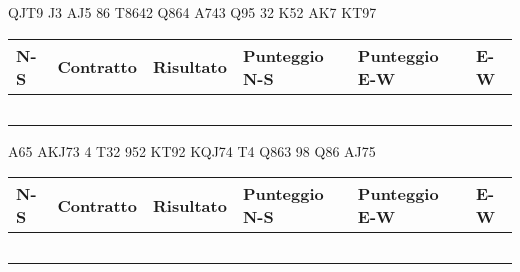 \documentclass[a4paper,italian,12pt]{article}
\begin{document}
\medskip

\begin{tcolorbox}
\begin{minipage}{.3\textwidth}
\newgame
{}
     {QJT9} {J3} {AJ5}
     {86} {T8642} {Q864}
     {A743} {Q95} {32}
     {K52} {AK7} {KT97}



\hspace{-.2cm}\showAll
\end{minipage}
\begin{minipage}{.7\textwidth}

\renewcommand{\arraystretch}{2}
\begin{tabular}{|l|l|l|l|l|l|}
\hline
N-S & Contratto\hspace{1.5cm} & Risultato& Punteggio N-S & Punteggio E-W & E-W\\\hline
  &&&&&\\\hline
   &&&&&\\\hline
    &&&&&\\\hline
     &&&&&\\\hline
          &&&&&\\\hline
\end{tabular}
\end{minipage}
\end{tcolorbox}

\medskip

\begin{tcolorbox}
\begin{minipage}{.3\textwidth}
\newgame
{}
     {A65} {AKJ73} {4}
     {T32} {952} {KT92}
     {KQJ74} {T4} {Q863}
     {98} {Q86} {AJ75}


    \hspace{-.2cm}\showAll
\end{minipage}
\begin{minipage}{.7\textwidth}

\renewcommand{\arraystretch}{2}
\begin{tabular}{|l|l|l|l|l|l|}
\hline
N-S & Contratto\hspace{1.5cm} & Risultato& Punteggio N-S & Punteggio E-W & E-W\\\hline
  &&&&&\\\hline
   &&&&&\\\hline
    &&&&&\\\hline
     &&&&&\\\hline
          &&&&&\\\hline
\end{tabular}
\end{minipage}
\end{tcolorbox}
\end{document}
